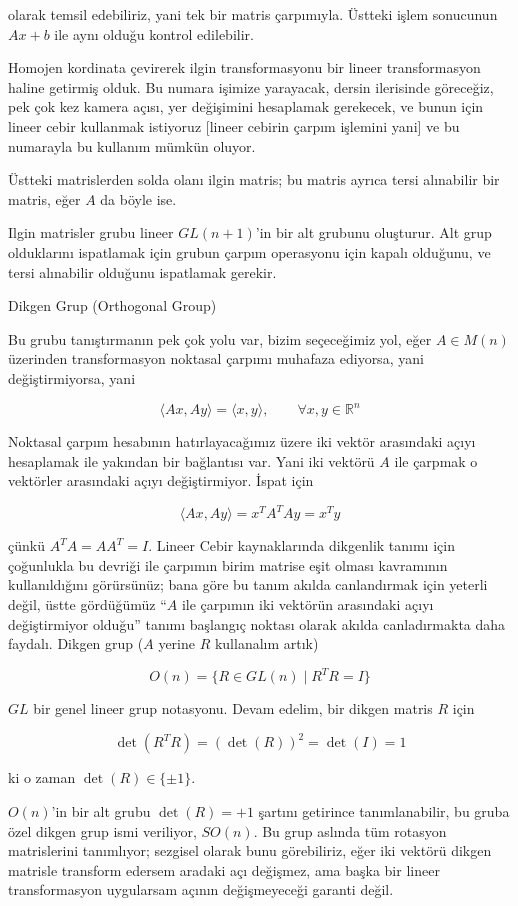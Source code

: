 \documentclass[12pt,fleqn]{article}\usepackage{../../common}
\begin{document}
olarak temsil edebiliriz, yani tek bir matris çarpımıyla. Üstteki işlem
sonucunun $Ax+b$ ile aynı olduğu kontrol edilebilir. 

Homojen kordinata çevirerek ilgin transformasyonu bir lineer transformasyon
haline getirmiş olduk. Bu numara işimize yarayacak, dersin ilerisinde
göreceğiz, pek çok kez kamera açısı, yer değişimini hesaplamak gerekecek,
ve bunun için lineer cebir kullanmak istiyoruz [lineer cebirin çarpım
işlemini yani] ve bu numarayla bu kullanım mümkün oluyor.

Üstteki matrislerden solda olanı ilgin matris; bu matris ayrıca tersi
alınabilir bir matris, eğer $A$ da böyle ise. 

Ilgin matrisler grubu lineer $GL(n+1)$'in bir alt grubunu oluşturur. Alt
grup olduklarını ispatlamak için grubun çarpım operasyonu için kapalı
olduğunu, ve tersi alınabilir olduğunu ispatlamak gerekir.

Dikgen Grup (Orthogonal Group)

Bu grubu tanıştırmanın pek çok yolu var, bizim seçeceğimiz yol, eğer $A \in
M(n)$ üzerinden transformasyon noktasal çarpımı muhafaza ediyorsa, yani
değiştirmiyorsa, yani

$$ \langle Ax, Ay \rangle = \langle x,y \rangle,  
\qquad \forall x,y \in \mathbb{R}^n
$$

Noktasal çarpım hesabının hatırlayacağımız üzere iki vektör arasındaki
açıyı hesaplamak ile yakından bir bağlantısı var. Yani iki vektörü $A$ ile
çarpmak o vektörler arasındaki açıyı değiştirmiyor. İspat için

$$ \langle Ax, Ay \rangle = x^T A^TA y = x^Ty $$

çünkü $A^TA = AA^T = I$. Lineer Cebir kaynaklarında dikgenlik tanımı için
çoğunlukla bu devriği ile çarpımın birim matrise eşit olması kavramının
kullanıldığını görürsünüz; bana göre bu tanım akılda canlandırmak için
yeterli değil, üstte gördüğümüz ``$A$ ile çarpımın iki vektörün arasındaki
açıyı değiştirmiyor olduğu'' tanımı başlangıç noktası olarak akılda
canladırmakta daha faydalı. Dikgen grup ($A$ yerine $R$ kullanalım artık)

$$ O(n) = \{ R \in GL(n) \mid R^TR = I \} $$

$GL$ bir genel lineer grup notasyonu.  Devam edelim, bir dikgen matris $R$
için

$$ \det(R^TR) = (\det(R))^2 = \det(I) = 1 $$

ki o zaman $\det(R) \in \{\pm 1\}$. 

$O(n)$'in bir alt grubu $\det(R) = +1$ şartını getirince tanımlanabilir, bu
gruba özel dikgen grup ismi veriliyor, $SO(n)$. Bu grup aslında tüm
rotasyon matrislerini tanımlıyor; sezgisel olarak bunu görebiliriz, eğer
iki vektörü dikgen matrisle transform edersem aradaki açı değişmez, ama
başka bir lineer transformasyon uygularsam açının değişmeyeceği garanti
değil.
\end{document}
